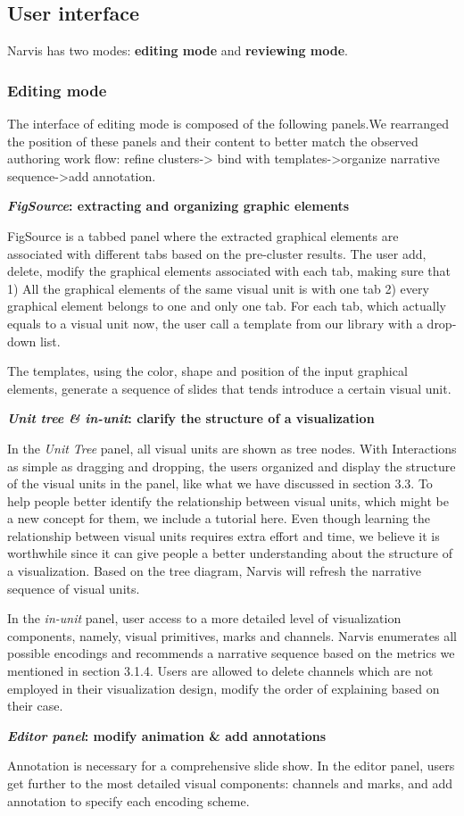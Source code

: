 \documentclass[review,journal]{vgtc}         %
\begin{document}
\subsection{User interface} 
Narvis has two modes: \textbf{editing mode} and \textbf{reviewing mode}. 
\subsubsection{Editing mode}
The interface of editing mode is composed of the following panels.We rearranged the position of these panels and their content to better match the observed authoring work flow: refine clusters-> bind with templates->organize narrative sequence->add annotation. 
\par
\textbf{\textit{FigSource}: extracting and organizing graphic elements}\par
FigSource is a tabbed panel where the extracted graphical elements are associated with different tabs based on the pre-cluster results. The user add, delete, modify the graphical elements associated with each tab, making sure that 1) All the graphical elements of the same visual unit is with one tab 2) every graphical element belongs to one and only one tab. For each tab, which actually equals to a visual unit now, the user call a template from our library with a drop-down list. \par
The templates, using the color, shape and position of the input graphical elements, generate a sequence of slides that tends introduce a certain visual unit.\par
\textbf{\textit{Unit tree \& in-unit}: clarify the structure of a visualization}\par
In the \textit{Unit Tree} panel, all visual units are shown as tree nodes. With Interactions as simple as dragging and dropping, the users organized and display the structure of the visual units in the panel, like what we have discussed in section 3.3. To help people better identify the relationship between visual units, which might be a new concept for them, we include a tutorial here. Even though learning the relationship between visual units requires extra effort and time, we believe it is worthwhile since it can give people a better understanding about the structure of a visualization. Based on the tree diagram, Narvis will refresh the narrative sequence of visual units. \par
In the \textit{in-unit} panel, user access to a more detailed level of visualization components, namely, visual primitives, marks and channels. Narvis enumerates all possible encodings and recommends a narrative sequence based on the metrics we mentioned in section 3.1.4. Users are allowed to delete channels which are not employed in their visualization design, modify the order of explaining based on their case. \par
 \textbf{\textit{Editor panel}: modify animation \& add annotations} \par
Annotation is necessary for a  comprehensive slide show. In the editor panel, users get further to the most detailed visual components: channels and marks, and add annotation to specify each encoding scheme. \par
\end{document}
